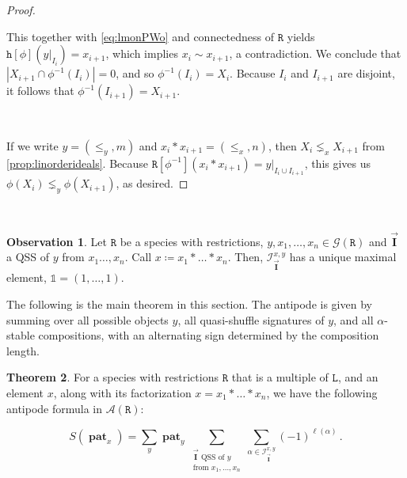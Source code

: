 \documentclass[12pt, reqno]{amsart}
\theoremstyle{definition}
\newtheorem{thm}{Theorem}[section]
\newtheorem{obs}[thm]{Observation}
\newcommand{\III}{\vec{\mathbf{I}}}
\DeclareMathOperator{\pat}{\mathbf{pat}}
\begin{document}
\begin{proof}
\

This together with \eqref{eq:lmonPWo} and connectedness of $\mathtt{R}$ yields $\mathtt{h}[\phi](y|_{I_i}) = x_{i+1}$, which implies $x_i \sim x_{i+1}$, a contradiction.
We conclude that $|X_{i+1} \cap \phi^{-1}(I_i)| = 0$, and so $\phi^{-1}(I_i) = X_i$.
Because $I_i$ and $I_{i+1}$ are disjoint, it follows that $\phi^{-1}(I_{i+1}) = X_{i+1}$.

\

If we write $y = (\leq_y, m)$ and $x_i \ast x_{i+1} = (\leq_x, n)$, then $X_i \lneq_x X_{i+1}$ from \cref{prop:linorderideals}.
Because $\mathtt{R}[\phi^{-1}](x_i \ast x_{i+1}) = y|_{I_i \cup I_{i+1}}$, this gives us $\phi(X_i) \lneq_y \phi(X_{i+1})$, as desired.
\end{proof}

\


\begin{obs}
Let $\mathtt{R}$ be a species with restrictions, $y, x_1, \dots, x_n \in \mathcal G(\mathtt{R})$ and $\III$ a QSS of $y$ from $x_1\dots, x_n$.
Call $x \coloneqq x_1 \ast \dots \ast x_n$.
Then, $\mathcal I^{x, y}_{\III}$ has a unique maximal element, $\mathbb{1} = (1, \dots, 1)$.
\end{obs}

The following is the main theorem in this section. The antipode is given by summing over all possible objects $y$, all quasi-shuffle signatures of $y$, and all $\alpha$-stable compositions, with an alternating sign determined by the composition length.

\begin{thm}\label{thm:general_antipode}
For a species with restrictions $\mathtt{R}$ that is a multiple of $\mathtt{L}$, and an element $x$, along with its factorization $x=x_1 \ast \dots \ast x_n$, we have the following antipode formula in $\mathcal A (\mathtt{R})$:

$$S(\pat_x) = \sum_y \pat_y \sum_{\substack{\III \text{ QSS of $y$}\\ \text{from }x_1, \dots , x_n}}  \sum_{\alpha \in \mathcal I^{x, y}_{\III}} (-1)^{\ell ( \alpha)} \, .$$
\end{thm}
\end{document}
